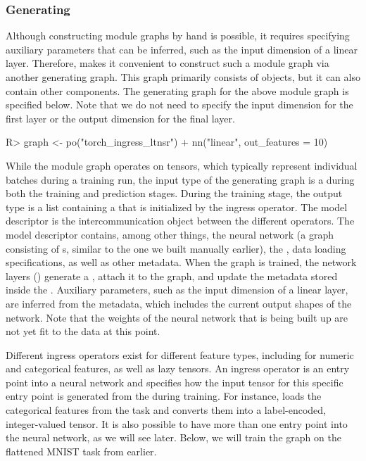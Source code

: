 \documentclass[article]{jss}
\theoremstyle{definition}
\begin{document}
\subsubsection[Generating Graph]{Generating }

Although constructing module graphs by hand is possible, it requires specifying auxiliary parameters that can be inferred, such as the input dimension of a linear layer.
Therefore,  makes it convenient to construct such a module graph via another generating graph.
This graph primarily consists of  objects, but it can also contain other components.
The generating graph for the above module graph is specified below.
Note that we do not need to specify the input dimension for the first layer or the output dimension for the final layer.

\begin{CodeInput}
R> graph <- po("torch_ingress_ltnsr") %
+    nn("linear", out_features = 10) %
\end{CodeInput}

While the module graph operates on tensors, which typically represent individual batches during a training run, the input type of the generating graph is a  during both the training and prediction stages.
During the training stage, the output type is a list containing a  that is initialized by the  ingress operator.
The model descriptor is the intercommunication object between the different  operators.
The model descriptor contains, among other things, the neural network (a graph consisting of s, similar to the one we built manually earlier), the , data loading specifications, as well as other metadata.
When the graph is trained, the network layers () generate a , attach it to the graph, and update the metadata stored inside the .
Auxiliary parameters, such as the input dimension of a linear layer, are inferred from the metadata, which includes the current output shapes of the network.
Note that the weights of the neural network that is being built up are not yet fit to the data at this point.

Different ingress operators exist for different feature types, including for numeric and categorical features, as well as lazy tensors.
An ingress operator is an entry point into a neural network and specifies how the input tensor for this specific entry point is generated from the  during training.
For instance,  loads the categorical features from the task and converts them into a label-encoded, integer-valued tensor.
It is also possible to have more than one entry point into the neural network, as we will see later.
Below, we will train the graph on the flattened MNIST task from earlier.
\end{document}

